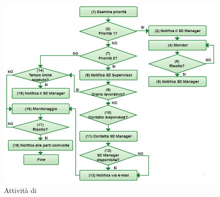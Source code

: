 \begin{figure}[htbp]
\centering
\includegraphics[scale=0.3]{Images/Diagrams/Incident_Management_Escalation_Process.png}
\caption{Attività di }
\label{im-escalation-activities-img}
\end{figure}

